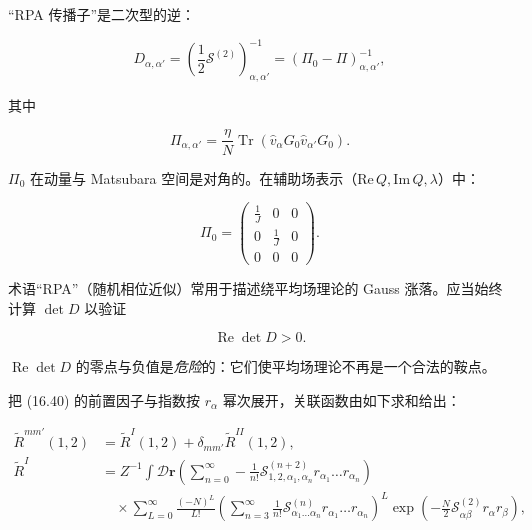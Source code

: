 “RPA 传播子”是二次型的逆：

\begin{equation*}
D _ {\alpha , \alpha '} = \left( \frac {1}{2} \mathcal {S} ^ {(2)} \right)_{\alpha , \alpha '} ^ {- 1} = \left( \Pi_ {0} - \Pi \right)_{\alpha , \alpha '} ^ {- 1} ,
\tag{17.20}
\end{equation*}

其中

\begin{equation*}
\Pi_{\alpha , \alpha '} = \frac {\eta}{N} \operatorname{Tr} \left( \hat {v} _ {\alpha} G _ {0} \hat {v} _ {\alpha '} G _ {0} \right).
\tag{17.21}
\end{equation*}

$\Pi_{0}$ 在动量与 Matsubara 空间是对角的。在辅助场表示（$\mathrm{Re}\, Q, \mathrm{Im}\, Q, \lambda$）中：

\begin{equation*}
\Pi_ {0} = \left( \begin{array}{ccc} \frac {1}{J} & 0 & 0 \\ 0 & \frac {1}{J} & 0 \\ 0 & 0 & 0 \end{array} \right).
\tag{17.22}
\end{equation*}

术语“RPA”（随机相位近似）常用于描述绕平均场理论的 Gauss 涨落。应当始终计算 $\det D$ 以验证

\begin{equation*}
\operatorname{Re} \det D > 0.
\tag{17.23}
\end{equation*}

$\operatorname{Re} \det D$ 的零点与负值是\emph{危险}的：它们使平均场理论不再是一个合法的鞍点。

把 (16.40) 的前置因子与指数按 $r_{\alpha}$ 幂次展开，关联函数由如下求和给出：

\begin{align*}
\tilde {R} ^ {mm '} ( 1, 2 ) & = \tilde {R} ^ {I} ( 1, 2 ) + \delta_{mm '} \tilde {R} ^ {II} ( 1, 2 ) ,\\
\tilde {R} ^ {I} & = Z ^ {- 1} \int \mathcal {D} \mathbf {r} \left( \sum_{n = 0} ^ {\infty} - \frac {1}{n !} \mathcal {S}_{1, 2, \alpha_ {1}, \alpha_ {n}} ^ {( n + 2 )} r_{\alpha_ {1}} \dots r_{\alpha_ {n}} \right)\\
& \quad \times \sum_{L = 0} ^ {\infty} \frac {( - N ) ^ {L}}{L !} \left( \sum_{n = 3} ^ {\infty} \frac {1}{n !} \mathcal {S}_{\alpha_ {1} \ldots \alpha_ {n}} ^ {( n )} r_{\alpha_ {1}} \dots r_{\alpha_ {n}} \right) ^ {L} \exp \left( - \frac {N}{2} \mathcal {S}_{\alpha \beta} ^ {( 2 )} r_{\alpha} r_{\beta} \right) ,
\end{align*}

